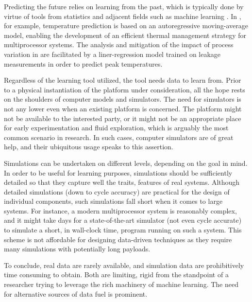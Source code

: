 Predicting the future relies on learning from the past, which is typically done
by virtue of tools from statistics and adjacent fields such as machine learning
\cite{bishop2006}. In \cite{coskun2008}, for example, temperature prediction is
based on an autoregressive moving-average model, enabling the development of an
efficient thermal management strategy for multiprocessor systems. The analysis
and mitigation of the impact of process variation in \cite{juan2014} are
facilitated by a liner-regression model trained on leakage measurements in order
to predict peak temperatures.

Regardless of the learning tool utilized, the tool needs data to learn from.
Prior to a physical instantiation of the platform under consideration, all the
hope rests on the shoulders of computer models and simulators. The need for
simulators is not any lower even when an existing platform is concerned. The
platform might not be available to the interested party, or it might not be an
appropriate place for early experimentation and fluid exploration, which is
arguably the most common scenario in research. In such cases, computer
simulators are of great help, and their ubiquitous usage speaks to this
assertion.

Simulations can be undertaken on different levels, depending on the goal in
mind. In order to be useful for learning purposes, simulations should be
sufficiently detailed so that they capture well the traits, features of real
systems. Although detailed simulations (down to cycle accuracy) are practical
for the design of individual components, such simulations fall short when it
comes to large systems. For instance, a modern multiprocessor system is
reasonably complex, and it might take days for a state-of-the-art simulator (not
even cycle accurate) to simulate a short, in wall-clock time, program running on
such a system. This scheme is not affordable for designing data-driven
techniques as they require many simulations with potentially long payloads.

To conclude, real data are rarely available, and simulation data are
prohibitively time consuming to obtain. Both are limiting, rigid from the
standpoint of a researcher trying to leverage the rich machinery of machine
learning. The need for alternative sources of data fuel is prominent.
